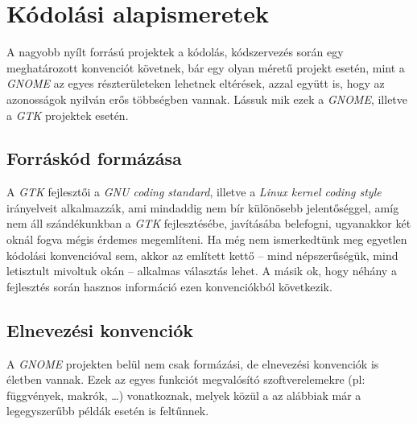 \section{Kódolási alapismeretek}

A nagyobb nyílt forrású projektek a kódolás, kódszervezés során egy meghatározott konvenciót követnek, bár egy olyan méretű projekt esetén, mint a \textit{GNOME} az egyes részterületeken lehetnek eltérések, azzal együtt is, hogy az azonosságok nyilván erős többségben vannak. Lássuk mik ezek a \textit{GNOME}, illetve a \textit{GTK} projektek esetén.

\subsection{Forráskód formázása}

A \textit{GTK} fejlesztői a \textit{GNU coding standard}\cite{gnucodingstandards}, illetve a \textit{Linux kernel coding style}\cite{linuxcodingstyle} irányelveit alkalmazzák, ami mindaddig nem bír különösebb jelentőséggel, amíg nem áll szándékunkban a \textit{GTK} fejlesztésébe, javításába belefogni, ugyanakkor két oknál fogva mégis érdemes megemlíteni. Ha még nem ismerkedtünk meg egyetlen kódolási konvencióval sem, akkor az említett kettő -- mind népszerűségük, mind letisztult mivoltuk okán -- alkalmas választás lehet. A másik ok, hogy néhány a fejlesztés során hasznos információ ezen konvenciókból következik.

\subsection{Elnevezési konvenciók}

A \textit{GNOME} projekten belül nem csak formázási, de elnevezési konvenciók is életben vannak. Ezek az egyes funkciót megvalósító szoftverelemekre (pl: függvények, makrók, \dots) vonatkoznak, melyek közül a az alábbiak már a legegyszerűbb példák esetén is feltűnnek.

